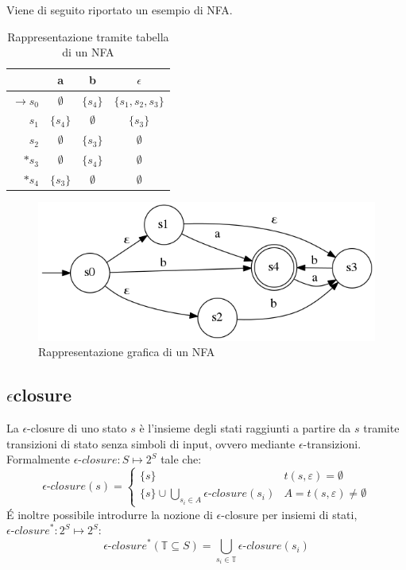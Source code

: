 \begin{ex}
Viene di seguito riportato un esempio di NFA.

\begin{table}[htbp]
\begin{center}
\begin{tabular}{r | c  c  c}
& a & b & $\epsilon$ \\ \hline
$\rightarrow s_0$ & $\emptyset$ & $\{s_4\}$ & $\{s_1,s_2,s_3\}$\\
$s_1$ & $\{s_4\}$ & $\emptyset$ & $\{s_3\}$\\
$s_2$ & $\emptyset$ & $\{s_3\}$ & $\emptyset$\\ 
$*s_3$ & $\emptyset$ & $\{s_4\}$ & $\emptyset$\\ 
$*s_4$ & $\{s_3\}$ & $\emptyset$ & $\emptyset$\\
\end{tabular}
\caption{Rappresentazione tramite tabella di un NFA}
\label{tab:nfa}
\end{center}
\end{table}

\begin{figure}[htbp]
\centering
\includegraphics[scale=0.4]{./Img/automi/nfa.png}
\caption{Rappresentazione grafica di un NFA}
\label{fig:nfa}
\end{figure}

\end{ex}

\subsection{\texorpdfstring{$\epsilon$}-closure}
La $\epsilon$-closure di uno stato $s$ è l'insieme degli stati raggiunti a partire da $s$ tramite transizioni di stato senza simboli di input, ovvero mediante $\epsilon$-transizioni.
Formalmente $\epsilon\textit{-closure} : S \mapsto 2^S$ tale che:
$$
\epsilon\textit{-closure}(s) = \begin{cases}
\{s\} & t(s, \varepsilon) = \emptyset \\
\{s\} \cup \displaystyle \bigcup_{s_i \in A} \epsilon\textit{-closure}(s_i) & A = t(s, \varepsilon) \ne \emptyset
\end{cases}
$$
\'E inoltre possibile introdurre la nozione di $\epsilon$-closure per insiemi di stati, $\epsilon\textit{-closure}^*: 2^S \mapsto 2^S$:
$$
\epsilon\textit{-closure}^*(\mathbb{T} \subseteq S) = \displaystyle\bigcup_{s_i \in \mathbb{T}} \epsilon\textit{-closure}(s_i)
$$

